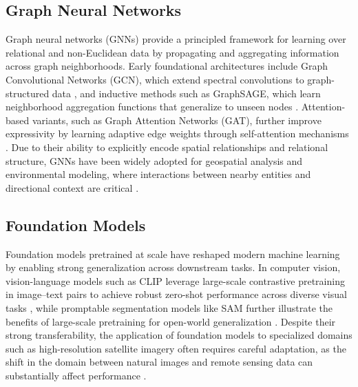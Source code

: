 \documentclass{article}
\theoremstyle{plain}
\theoremstyle{definition}
\theoremstyle{remark}
\begin{document}
\subsection{Graph Neural Networks}
Graph neural networks (GNNs) provide a principled framework for learning over relational and non-Euclidean data by propagating and aggregating information across graph neighborhoods. Early foundational architectures include Graph Convolutional Networks (GCN), which extend spectral convolutions to graph-structured data \cite{kipf2016semi}, and inductive methods such as GraphSAGE, which learn neighborhood aggregation functions that generalize to unseen nodes \cite{hamilton2017inductive}. Attention-based variants, such as Graph Attention Networks (GAT), further improve expressivity by learning adaptive edge weights through self-attention mechanisms \cite{velivckovic2017graph}. Due to their ability to explicitly encode spatial relationships and relational structure, GNNs have been widely adopted for geospatial analysis and environmental modeling, where interactions between nearby entities and directional context are critical \cite{wu2020comprehensive}.

\subsection{Foundation Models}

Foundation models pretrained at scale have reshaped modern machine learning by enabling strong generalization across downstream tasks. In computer vision, vision-language models such as CLIP leverage large-scale contrastive pretraining in image–text pairs to achieve robust zero-shot performance across diverse visual tasks \cite{radford2021learning}, while promptable segmentation models like SAM further illustrate the benefits of large-scale pretraining for open-world generalization \cite{kirillov2023segment}. Despite their strong transferability, the application of foundation models to specialized domains such as high-resolution satellite imagery often requires careful adaptation, as the shift in the domain between natural images and remote sensing data can substantially affect performance \cite{liu2024remoteclip}.
\end{document}
